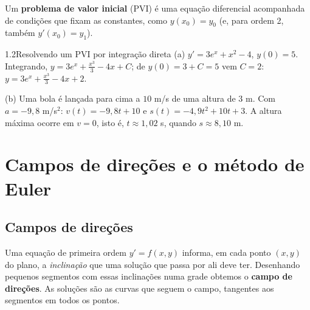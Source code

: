 \begin{definicao}
Um \textbf{problema de valor inicial} (PVI) é uma equação
diferencial acompanhada de condições que fixam as constantes, como $y(x_0)=y_0$ (e, para
ordem 2, também $y'(x_0)=y_1$).
\end{definicao}

\begin{exemplo}{1.2}{Resolvendo um PVI por integração direta}
(a) $y'=3e^x+x^2-4$, $y(0)=5$. Integrando, $y=3e^x+\frac{x^3}3-4x+C$; de $y(0)=3+C=5$
vem $C=2$: $y=3e^x+\frac{x^3}3-4x+2$.

(b) Uma bola é lançada para cima a $10$ m/s de uma altura de $3$ m. Com $a=-9{,}8$ m/s$^2$:
$v(t)=-9{,}8t+10$ e $s(t)=-4{,}9t^2+10t+3$. A altura máxima ocorre em $v=0$, isto é,
$t\approx1{,}02$ s, quando $s\approx8{,}10$ m.
\end{exemplo}

\section{Campos de direções e o método de Euler}

\subsection{Campos de direções}

Uma equação de primeira ordem $y'=f(x,y)$ informa, em cada ponto $(x,y)$ do plano, a
\emph{inclinação} que uma solução que passa por ali deve ter. Desenhando pequenos segmentos com
essas inclinações numa grade obtemos o \textbf{campo de direções}.
As soluções são as curvas que seguem o campo, tangentes aos segmentos em todos os pontos.

